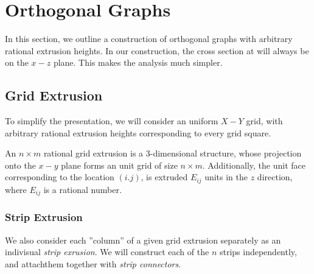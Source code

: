 \section{Orthogonal Graphs}
\label{sec:orthogonal_graphs}

In this section, we outline a construction of orthogonal graphs with arbitrary rational extrusion heights.
In our construction, the cross section at will always be on the $x-z$ plane.
This makes the analysis much simpler.

\subsection{Grid Extrusion}
\label{sec:grid_extrusion}

To simplify the presentation, we will consider an uniform $X-Y$ grid,
with arbitrary rational extrusion heights corresponding to every grid square.
\begin{definition}
An $n\times m$ rational grid extrusion is a 3-dimensional structure,
whose projection onto the $x-y$ plane forms an unit grid of size $n\times m$.
Additionally, the unit face corresponding to the location $(i.j)$,
is extruded $E_{ij}$ units in the $z$ direction, where $E_{ij}$ is a rational number.
\end{definition}

\subsubsection{Strip Extrusion}
\label{sec:strip_extrusion}
We also consider each ''column'' of a given grid extrusion separately as an indivisual \emph{strip exrusion}.
We will construct each of the $n$ strips independently, and attachthem together with \emph{strip connectors}.


